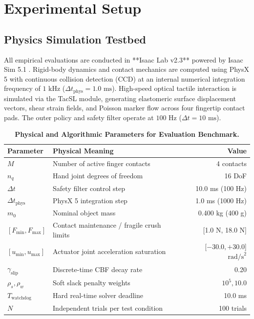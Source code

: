 \section{Experimental Setup}
\label{sec:experimental_setup}

\subsection{Physics Simulation Testbed}
All empirical evaluations are conducted in **Isaac Lab v2.3** powered by Isaac Sim 5.1 \cite{isaacsim2024}. Rigid-body dynamics and contact mechanics are computed using PhysX 5 with continuous collision detection (CCD) at an internal numerical integration frequency of $1\text{ kHz}$ ($\Delta t_{\text{phys}} = 1.0\text{ ms}$). High-speed optical tactile interaction is simulated via the TacSL module, generating elastomeric surface displacement vectors, shear strain fields, and Poisson marker flow across four fingertip contact pads. The outer policy and safety filter operate at $100\text{ Hz}$ ($\Delta t = 10\text{ ms}$).

\begin{table}[t]
\centering
\caption{\textbf{Physical and Algorithmic Parameters for Evaluation Benchmark.}}
\label{tab:parameters}
\small
\begin{tabular}{llr}
\toprule
\textbf{Parameter} & \textbf{Physical Meaning} & \textbf{Value} \\
\midrule
$M$ & Number of active finger contacts & 4 contacts \\
$n_q$ & Hand joint degrees of freedom & 16 DoF \\
$\Delta t$ & Safety filter control step & 10.0 ms (100 Hz) \\
$\Delta t_{\text{phys}}$ & PhysX 5 integration step & 1.0 ms (1000 Hz) \\
$m_0$ & Nominal object mass & 0.400 kg (400 g) \\
$[F_{\min}, F_{\max}]$ & Contact maintenance / fragile crush limits & [1.0 N, 18.0 N] \\
$[u_{\min}, u_{\max}]$ & Actuator joint acceleration saturation & [$-30.0, +30.0$] $\text{rad/s}^2$ \\
$\gamma_{\text{slip}}$ & Discrete-time CBF decay rate & 0.20 \\
$\rho_s, \rho_w$ & Soft slack penalty weights & $10^5, 10.0$ \\
$T_{\text{watchdog}}$ & Hard real-time solver deadline & 10.0 ms \\
$N$ & Independent trials per test condition & 100 trials \\
\bottomrule
\end{tabular}
\end{table}

